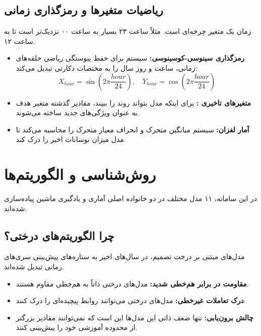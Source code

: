 \documentclass[12pt, a4paper]{article}
\begin{document}
	\subsection{ریاضیات متغیرها و رمزگذاری زمانی}
	زمان یک متغیر چرخه‌ای است. مثلاً ساعت ۲۳ بسیار به ساعت ۰۰ نزدیک‌تر است تا به ساعت ۱۲.
	\begin{itemize}
		\item \textbf{رمزگذاری سینوسی-کوسینوسی:} سیستم برای حفظ پیوستگی ریاضی حلقه‌های زمانی، ساعت و روز سال را به مختصات دکارتی تبدیل می‌کند:
		\begin{equation}
			X_{hour} = \sin\left(2\pi \frac{hour}{24}\right), \quad Y_{hour} = \cos\left(2\pi \frac{hour}{24}\right)
		\end{equation}
		\item \textbf{متغیرهای تاخیری :} برای اینکه مدل بتواند روند را ببیند، مقادیر گذشته متغیر هدف به عنوان ویژگی‌های جدید ساخته می‌شوند.
		\item \textbf{آمار لغزان:} سیستم میانگین متحرک و انحراف معیار متحرک را محاسبه می‌کند تا مدل میزان نوسانات اخیر را درک کند.
	\end{itemize}
	
	\section{روش‌شناسی و الگوریتم‌ها}
	در این سامانه، ۱۱ مدل مختلف در دو خانواده اصلی آماری و یادگیری ماشین پیاده‌سازی شده‌اند.
	
	\subsection{چرا الگوریتم‌های درختی؟}
	مدل‌های مبتنی بر درخت تصمیم، در سال‌های اخیر به ستاره‌های پیش‌بینی سری‌های زمانی تبدیل شده‌اند.
	\begin{itemize}
		\item \textbf{مقاومت در برابر هم‌خطی شدید:} مدل‌های درختی ذاتاً به هم‌خطی مقاوم هستند.
		\item \textbf{درک تعاملات غیرخطی:} مدل‌های درختی می‌توانند روابط پیچیده‌ای را درک کنند.
		\item \textbf{چالش برون‌یابی:} تنها ضعف ذاتی این مدل‌ها این است که نمی‌توانند مقادیر بزرگتر از محدوده آموزشی خود را پیش‌بینی کنند.
	\end{itemize}
	
\end{document}
